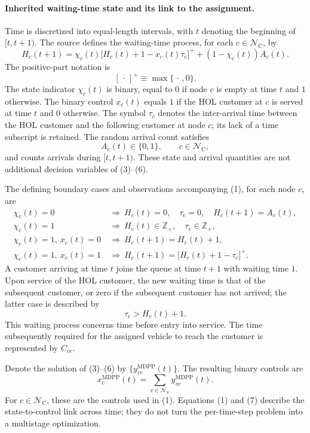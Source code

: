 \documentclass{article}
\begin{document}
\paragraph{Inherited waiting-time state and its link to the assignment.}
Time is discretized into equal-length intervals, with $t$ denoting the beginning of $[t,t+1)$. The source defines the waiting-time process, for each $c\in\mathcal N_{\mathrm C}$, by
\begin{equation}
H_c(t+1)=\chi_c(t)\bigl[H_c(t)+1-x_c(t)\tau_c\bigr]^+
 +(1-\chi_c(t))A_c(t). \tag{1}
\end{equation}
The positive-part notation is
\[
[\,\cdot\,]^+\equiv\max\{\,\cdot\,,0\}.
\]
The state indicator $\chi_c(t)$ is binary, equal to $0$ if node $c$ is empty at time $t$ and $1$ otherwise. The binary control $x_c(t)$ equals $1$ if the HOL customer at $c$ is served at time $t$ and $0$ otherwise. The symbol $\tau_c$ denotes the inter-arrival time between the HOL customer and the following customer at node $c$; its lack of a time subscript is retained. The random arrival count satisfies
\[
A_c(t)\in\{0,1\},\qquad c\in\mathcal N_{\mathrm C},
\]
and counts arrivals during $[t,t+1)$. These state and arrival quantities are not additional decision variables of (3)--(6).

The defining boundary cases and observations accompanying (1), for each node $c$, are
\begin{align*}
\chi_c(t)=0
&\ \Longrightarrow\ H_c(t)=0,\quad \tau_c=0,\quad H_c(t+1)=A_c(t),\\
\chi_c(t)=1
&\ \Longrightarrow\ H_c(t)\in\mathbb Z_+,\quad \tau_c\in\mathbb Z_+,\\
\chi_c(t)=1,\ x_c(t)=0
&\ \Longrightarrow\ H_c(t+1)=H_c(t)+1,\\
\chi_c(t)=1,\ x_c(t)=1
&\ \Longrightarrow\ H_c(t+1)=\bigl[H_c(t)+1-\tau_c\bigr]^+.
\end{align*}
A customer arriving at time $t$ joins the queue at time $t+1$ with waiting time $1$. Upon service of the HOL customer, the new waiting time is that of the subsequent customer, or zero if the subsequent customer has not arrived; the latter case is described by
\[
\tau_c>H_c(t)+1.
\]
This waiting process concerns time before entry into service. The time subsequently required for the assigned vehicle to reach the customer is represented by $C_{vc}$.

Denote the solution of (3)--(6) by $\{y^{\mathrm{MDPP}}_{vc}(t)\}$. The resulting binary controls are
\begin{equation}
x^{\mathrm{MDPP}}_c(t)=\sum_{v\in\mathcal N_{\mathrm V}}y^{\mathrm{MDPP}}_{vc}(t). \tag{7}
\end{equation}
For $c\in\mathcal N_{\mathrm C}$, these are the controls used in (1). Equations (1) and (7) describe the state-to-control link across time; they do not turn the per-time-step problem into a multistage optimization.
\end{document}
